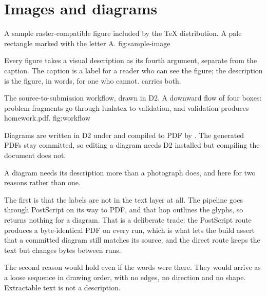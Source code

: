 \section{Images and diagrams}

  {A sample raster-compatible figure included by the TeX distribution.}
  {A pale rectangle marked with the letter A.}
  {fig:sample-image}

Every figure takes a visual description as its fourth argument, separate from the caption.
The caption is a label for a reader who can see the figure; the description is the figure, in words, for one who cannot.
 carries both.

  {The source-to-submission workflow, drawn in D2.}
  {A downward flow of four boxes: problem fragments go through lualatex to validation, and validation produces homework.pdf.}
  {fig:workflow}

Diagrams are written in D2 under  and compiled to PDF by .
The generated PDFs stay committed, so editing a diagram needs D2 installed but compiling the document does not.

A diagram needs its description more than a photograph does, and here for two reasons rather than one.

The first is that the labels are not in the text layer at all.
The pipeline goes through PostScript on its way to PDF, and that hop outlines the glyphs, so  returns nothing for a diagram.
That is a deliberate trade: the PostScript route produces a byte-identical PDF on every run, which is what lets the build assert that a committed diagram still matches its source, and the direct route keeps the text but changes bytes between runs.

The second reason would hold even if the words were there.
They would arrive as a loose sequence in drawing order, with no edges, no direction and no shape.
Extractable text is not a description.
